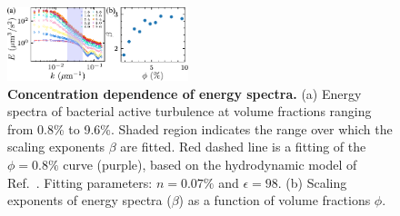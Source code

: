 \documentclass[twocolumn,aps,prl,amsmath,amssymb,longbibliography]{revtex4-2}
\begin{document}
\begin{figure}[!]
\begin{center}\includegraphics[width=0.47\textwidth]{figures/energy-spectra/v1.pdf}
\caption[Concentration dependence of energy spectra.]
{
\textbf{Concentration dependence of energy spectra.}
(a) Energy spectra of bacterial active turbulence at volume fractions ranging from 0.8\% to 9.6\%. Shaded region indicates the range over which the scaling exponents $\beta$ are fitted. Red dashed line is a fitting of the $\phi=0.8\%$ curve (purple), based on the hydrodynamic model of Ref.~\cite{Bardfalvy2019}. Fitting parameters: $n=0.07\%$ and $\epsilon=98$.
(b) Scaling exponents of energy spectra ($\beta$) as a function of volume fractions $\phi$.
}
\label{fig:energy-spectra}
\end{center}
\end{figure}
\end{document}
